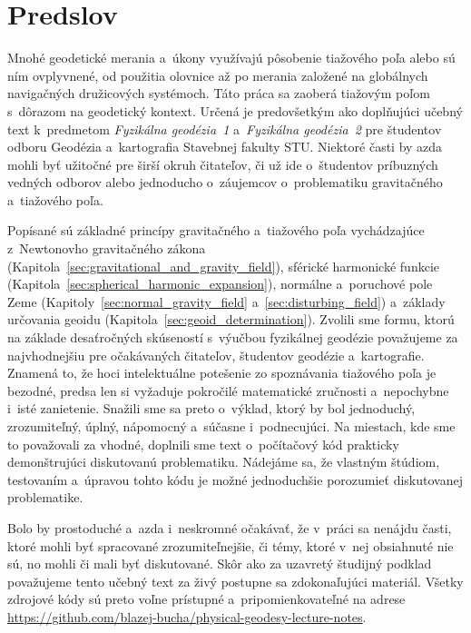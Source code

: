 \documentclass[a4paper, 12pt]{book}
\begin{document}

\chapter*{Predslov}

Mnohé geodetické merania a~úkony využívajú pôsobenie tiažového poľa alebo sú
ním ovplyvnené, od použitia olovnice až po merania založené na globálnych
navigačných družicových systémoch.  Táto práca sa zaoberá tiažovým poľom
s~dôrazom na geodetický kontext.  Určená je predovšetkým ako doplňujúci učebný
text k~predmetom \emph{Fyzikálna geodézia~1} a~\emph{Fyzikálna geodézia~2} pre
študentov odboru Geodézia a~kartografia Stavebnej fakulty STU.  Niektoré časti
by azda mohli byť užitočné pre širší okruh čitateľov, či už ide o~študentov
príbuzných vedných odborov alebo jednoducho o~záujemcov o~problematiku
gravitačného a~tiažového poľa.

Popísané sú základné princípy gravitačného a~tiažového poľa vychádzajúce
z~Newtonovho gravitačného zákona
(Kapitola~\ref{sec:gravitational_and_gravity_field}), sférické harmonické
funkcie (Kapitola~\ref{sec:spherical_harmonic_expansion}), normálne a~poruchové
pole Zeme (Kapitoly~\ref{sec:normal_gravity_field}
a~\ref{sec:disturbing_field}) a~základy určovania geoidu
(Kapitola~\ref{sec:geoid_determination}).  Zvolili sme formu, ktorú na základe
desaťročných skúseností s~výučbou fyzikálnej geodézie považujeme za
najvhodnejšiu pre očakávaných čitateľov, študentov geodézie a~kartografie.
Znamená to, že hoci intelektuálne potešenie zo spoznávania tiažového poľa je
bezodné, predsa len si vyžaduje pokročilé matematické zručnosti a~nepochybne
i~isté zanietenie.  Snažili sme sa preto o~výklad, ktorý by bol jednoduchý,
zrozumiteľný, úplný, nápomocný a~súčasne i~podnecujúci.  Na miestach, kde sme
to považovali za vhodné, doplnili sme text o~počítačový kód prakticky
demonštrujúci diskutovanú problematiku.  Nádejáme sa, že vlastným štúdiom,
testovaním a~úpravou tohto kódu je možné jednoduchšie porozumieť diskutovanej
problematike.

Bolo by prostoduché a~azda i~neskromné očakávať, že v~práci sa nenájdu časti,
ktoré mohli byť spracované zrozumiteľnejšie, či témy, ktoré v~nej obsiahnuté
nie sú, no mohli či mali byť diskutované.  Skôr ako za uzavretý študijný
podklad považujeme tento učebný text za živý postupne sa zdokonaľujúci
materiál.  Všetky zdrojové kódy sú preto voľne prístupné a~pripomienkovateľné
na adrese \url{https://github.com/blazej-bucha/physical-geodesy-lecture-notes}.
\end{document}
